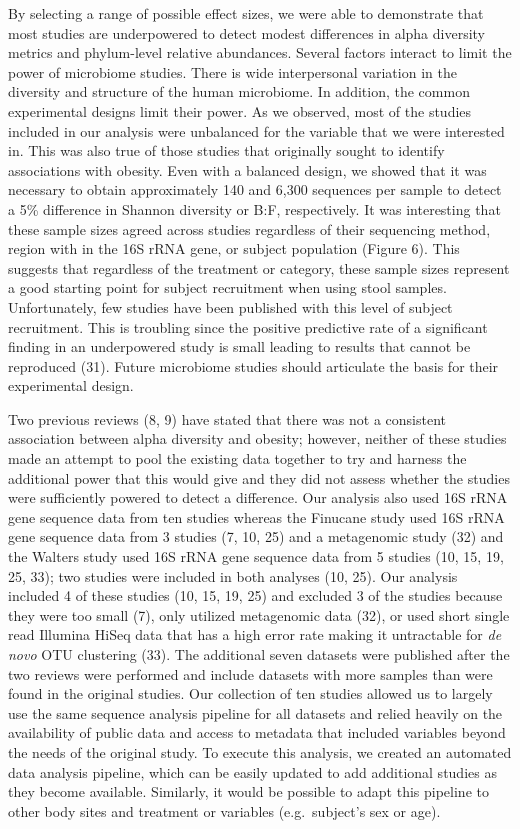 \documentclass[12pt,]{article}
\begin{document}
By selecting a range of possible effect sizes, we were able to
demonstrate that most studies are underpowered to detect modest
differences in alpha diversity metrics and phylum-level relative
abundances. Several factors interact to limit the power of microbiome
studies. There is wide interpersonal variation in the diversity and
structure of the human microbiome. In addition, the common experimental
designs limit their power. As we observed, most of the studies included
in our analysis were unbalanced for the variable that we were interested
in. This was also true of those studies that originally sought to
identify associations with obesity. Even with a balanced design, we
showed that it was necessary to obtain approximately 140 and 6,300
sequences per sample to detect a 5\% difference in Shannon diversity or
B:F, respectively. It was interesting that these sample sizes agreed
across studies regardless of their sequencing method, region with in the
16S rRNA gene, or subject population (Figure 6). This suggests that
regardless of the treatment or category, these sample sizes represent a
good starting point for subject recruitment when using stool samples.
Unfortunately, few studies have been published with this level of
subject recruitment. This is troubling since the positive predictive
rate of a significant finding in an underpowered study is small leading
to results that cannot be reproduced (31). Future microbiome studies
should articulate the basis for their experimental design.

Two previous reviews (8, 9) have stated that there was not a consistent
association between alpha diversity and obesity; however, neither of
these studies made an attempt to pool the existing data together to try
and harness the additional power that this would give and they did not
assess whether the studies were sufficiently powered to detect a
difference. Our analysis also used 16S rRNA gene sequence data from ten
studies whereas the Finucane study used 16S rRNA gene sequence data from
3 studies (7, 10, 25) and a metagenomic study (32) and the Walters study
used 16S rRNA gene sequence data from 5 studies (10, 15, 19, 25, 33);
two studies were included in both analyses (10, 25). Our analysis
included 4 of these studies (10, 15, 19, 25) and excluded 3 of the
studies because they were too small (7), only utilized metagenomic data
(32), or used short single read Illumina HiSeq data that has a high
error rate making it untractable for \emph{de novo} OTU clustering (33).
The additional seven datasets were published after the two reviews were
performed and include datasets with more samples than were found in the
original studies. Our collection of ten studies allowed us to largely
use the same sequence analysis pipeline for all datasets and relied
heavily on the availability of public data and access to metadata that
included variables beyond the needs of the original study. To execute
this analysis, we created an automated data analysis pipeline, which can
be easily updated to add additional studies as they become available.
Similarly, it would be possible to adapt this pipeline to other body
sites and treatment or variables (e.g.~subject's sex or age).
\end{document}
